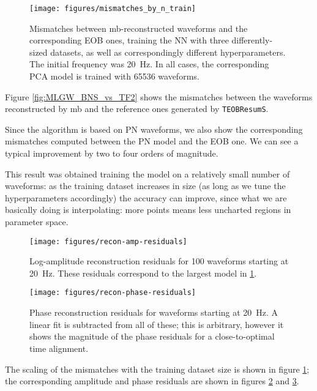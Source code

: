 \documentclass[main.tex]{subfiles}
\begin{document}
\begin{figure}[ht]
\centering
\texttt{[image: figures/mismatches\_by\_n\_train]}
\caption{Mismatches between \ac{mb}-reconstructed waveforms and the corresponding \ac{EOB} ones, training the \ac{NN} with three differently-sized datasets, as well as correspondingly different hyperparameters. The initial frequency was \SI{20}{Hz}. In all cases, the corresponding \ac{PCA} model is trained with 65536 waveforms.}
\label{fig:mismatches_by_n_train}
\end{figure}

Figure \ref{fig:MLGW_BNS_vs_TF2} shows the mismatches between the waveforms reconstructed by \ac{mb} and the reference ones generated by \texttt{TEOBResumS}. 

Since the algorithm is based on \ac{PN} waveforms, we also show the corresponding mismatches computed between the \ac{PN} model and the \ac{EOB} one. 
We can see a typical improvement by two to four orders of magnitude.

This result was obtained training the model on a relatively small number of waveforms: as the training dataset increases in size (as long as we tune the hyperparameters accordingly) the accuracy can improve, since what we are basically doing is interpolating: more points means less uncharted regions in parameter space. 


\begin{figure}[ht]
\centering
\texttt{[image: figures/recon-amp-residuals]}
\caption{Log-amplitude reconstruction residuals for 100 waveforms starting at \SI{20}{Hz}. These residuals correspond to the largest model in \ref{fig:mismatches_by_n_train}.}
\label{fig:recon-amp-residuals}
\end{figure}

\begin{figure}[ht]
\centering
\texttt{[image: figures/recon-phase-residuals]}
\caption{Phase reconstruction residuals for waveforms starting at \SI{20}{Hz}. A linear fit is subtracted from all of these; this is arbitrary, however it shows the magnitude of the phase residuals for a close-to-optimal time alignment.}
\label{fig:recon-phase-residuals}
\end{figure}

The scaling of the mismatches with the training dataset size is shown in figure \ref{fig:mismatches_by_n_train};
the corresponding amplitude and phase residuals are shown in figures \ref{fig:recon-amp-residuals} and \ref{fig:recon-phase-residuals}. 
\end{document}
